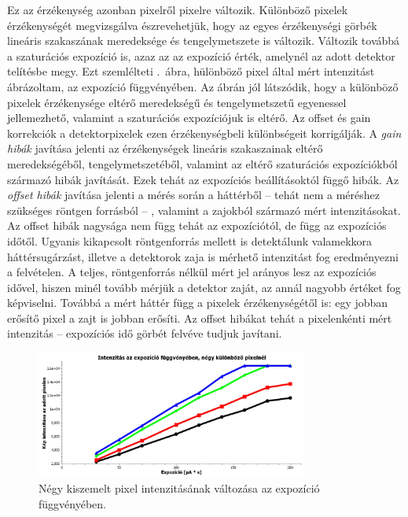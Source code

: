 \documentclass[a4paper,12pt]{article}
\begin{document}
Ez az érzékenység azonban pixelről pixelre változik. Különböző pixelek érzékenységét megvizsgálva észrevehetjük, hogy az egyes érzékenységi görbék lineáris szakaszának meredeksége és tengelymetszete is változik. Változik továbbá a szaturációs expozíció is, azaz az az expozíció érték, amelynél az adott detektor telítésbe megy. Ezt szemlélteti .~ábra, hülönböző pixel által mért intenzitást ábrázoltam, az expozíció függvényében. Az ábrán jól látszódik, hogy a különböző pixelek érzékenysége eltérő meredekségű és tengelymetszetű egyenessel jellemezhető, valamint a szaturációs expozíciójuk is eltérő. Az offset és gain korrekciók a detektorpixelek ezen érzékenységbeli különbségeit korrigálják. A \emph{gain hibák} javítása jelenti az érzékenységek lineáris szakaszainak eltérő meredekségéből, tengelymetszetéből, valamint az eltérő szaturációs expozíciókból származó hibák javítását. Ezek tehát az expozíciós beállításoktól függő hibák.
Az \emph{offset hibák} javítása jelenti a mérés során a háttérből -- tehát nem a méréshez szükséges röntgen forrásból -- , valamint a zajokból származó mért intenzitásokat.  Az offset  hibák nagysága nem függ tehát az expozíciótól, de függ az expozíciós időtől. Ugyanis kikapcsolt röntgenforrás mellett is detektálunk valamekkora háttérsugárzást, illetve a detektorok zaja is mérhető intenzitást fog eredményezni a felvételen. A teljes, röntgenforrás nélkül mért jel arányos lesz az expozíciós idővel, hiszen minél tovább mérjük a detektor zaját, az annál nagyobb értéket fog képviselni. Továbbá a mért háttér függ a pixelek érzékenységétől is: egy jobban erősítő pixel a zajt is jobban erősíti. Az offset hibákat  tehát a pixelenkénti mért intenzitás -- expozíciós idő görbét felvéve tudjuk javítani.





\begin{figure}[htbp]
\center
\includegraphics[width=0.8\textwidth]{abrak/gaingrafikon}
\caption{Négy kiszemelt pixel intenzitásának változása az expozíció függvényében.}
\label{fig:gaingrafikon}
\end{figure}
\end{document}

